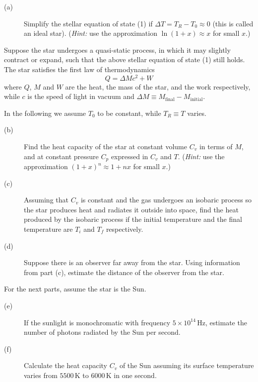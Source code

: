 
\begin{description}
\item[(a)] Simplify the stellar equation of state (1) if
  $\Delta T = T_R - T_0 \approx 0$ (this is called an ideal star).
  (\textit{Hint:} use the approximation $\ln(1+x) \approx x$ for small $x$.)
\end{description}

Suppose the star undergoes a quasi-static process, in which it may slightly
contract or expand, such that the above stellar equation of state (1) still
holds. The star satisfies the first law of thermodynamics
\begin{equation}
  Q = \Delta M c^2 + W
\end{equation}
where $Q$, $M$ and $W$ are the heat, the mass of the star, and the work
respectively, while $c$ is the speed of light in vacuum and
$\Delta M \equiv M_{\mathrm{final}} - M_{\mathrm{initial}}$.

In the following we assume $T_0$ to be constant, while $T_R \equiv T$ varies.

\begin{description}
\item[(b)] Find the heat capacity of the star at constant volume $C_v$ in terms
  of $M$, and at constant pressure $C_p$ expressed in $C_v$ and $T$.
  (\textit{Hint:} use the approximation $(1+x)^n \approx 1 + nx$ for small $x$.)
\item[(c)] Assuming that $C_v$ is constant and the gas undergoes an isobaric
  process so the star produces heat and radiates it outside into space, find the
  heat produced by the isobaric process if the initial temperature and the final
  temperature are $T_i$ and $T_f$ respectively.
\item[(d)] Suppose there is an observer far away from the star. Using
  information from part (c), estimate the distance of the observer from the
  star.
\end{description}

For the next parts, assume the star is the Sun.

\begin{description}
\item[(e)] If the sunlight is monochromatic with frequency $5\times10^{14}$\,Hz,
  estimate the number of photons radiated by the Sun per second.
\item[(f)] Calculate the heat capacity $C_v$ of the Sun assuming its surface
  temperature varies from $5500$\,K to $6000$\,K in one second.
\end{description}

